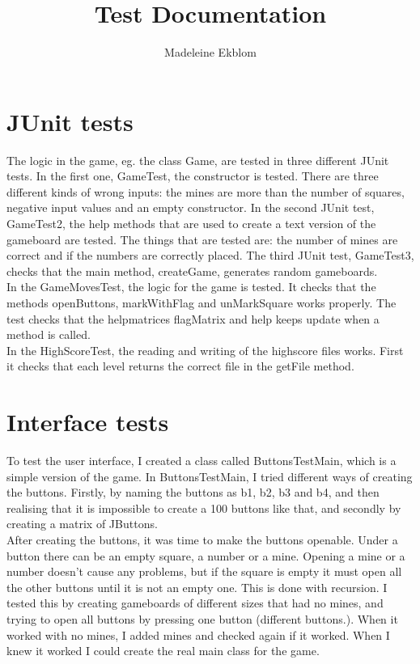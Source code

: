 \documentclass[12pt,twoside,a4paper]{article}
\title{Test Documentation}
\author{Madeleine Ekblom}
\begin{document}
\maketitle

\newpage

\section*{JUnit tests}

The logic in the game, eg. the class Game, are tested in three different JUnit tests. In the first one, GameTest, the constructor is tested. There are three different kinds of wrong inputs: the mines are more than the number of squares, negative input values and an empty constructor.
In the second JUnit test, GameTest2, the help methods that are used to create a text version of the gameboard are tested. The things that are tested are: the number of mines are correct and if the numbers are correctly placed.
The third JUnit test, GameTest3, checks that the main method, createGame, generates random gameboards. \\

In the GameMovesTest, the logic for the game is tested. It checks that the methods openButtons, markWithFlag and unMarkSquare works properly. The test checks that the helpmatrices flagMatrix and help keeps update when a method is called. \\

In the HighScoreTest, the reading and writing of the highscore files works. First it checks that each level returns the correct file in the getFile method.

\section*{Interface tests}

To test the user interface, I created a class called ButtonsTestMain, which is a simple version of the game. In ButtonsTestMain, I tried different ways of creating the buttons. Firstly, by naming the buttons as b1, b2, b3 and b4, and then realising that it is impossible to create a 100 buttons like that, and secondly by creating a matrix of JButtons. \\

After creating the buttons, it was time to make the buttons openable. Under a button there can be an empty square, a number or a mine. Opening a mine or a number doesn't cause any problems, but if the square is empty it must open all the other buttons until it is not an empty one. This is done with recursion. I tested this by creating gameboards of different sizes that had no mines, and trying to open all buttons by pressing one button (different buttons.). When it worked with no mines, I added mines and checked again if it worked. When I knew it worked I could create the real main class for the game.\\
\end{document}
